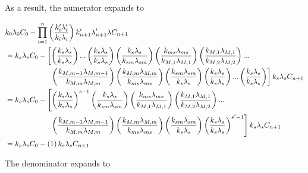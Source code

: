 \noindent As a result, the numerator expands to 

\begin{align*}
     & k_0 \lami{0} C_0 - \prod_{i=1}^n \parfrac{k_i' \lami{i}'}{k_i \lami{i}} k_{n+1}' \lami{n+1}' \lambda C_{n+1} \\
     &= k_s \lami{s} C_0 - \left[ \parfrac{k_s \lami{s}}{k_s \lami{s}} ... \parfrac{k_s \lami{s}}{k_s \lami{s}} \parfrac{k_s \lami{s}}{k_{sm} \lami{sm}} \parfrac{k_{ms} \lami{ms}}{k_{M,1} \lami{M,1}} \parfrac{k_{M,1} \lami{M,1}}{k_{M,2} \lami{M,2}} ... \right. \\
     & \hspace{60px} \left. \parfrac{k_{M,m-1} \lami{M,m-1}}{k_{M,m} \lami{M,m}} \parfrac{k_{M,m} \lami{M,m}}{k_{ms} \lami{ms}} \parfrac{k_{sm} \lami{sm}}{k_s \lami{s}} \parfrac{k_s \lami{s}}{k_s \lami{s}} ... \parfrac{k_s \lami{s}}{k_s \lami{s}} \right] k_s \lami{s} C_{n+1} \\
     &=  k_s \lami{s} C_0 - \left[ \parfrac{k_s \lami{s}}{k_s \lami{s}}^{s-1} \parfrac{k_s \lami{s}}{k_{sm} \lami{sm}} \parfrac{k_{ms} \lami{ms}}{k_{M,1} \lami{M,1}} \parfrac{k_{M,1} \lami{M,1}}{k_{M,2} \lami{M,2}} ... \right. \\
     & \hspace{60px} \left. \parfrac{k_{M,m-1} \lami{M,m-1}}{k_{M,m} \lami{M,m}} \parfrac{k_{M,m} \lami{M,m}}{k_{ms} \lami{ms}} \parfrac{k_{sm} \lami{sm}}{k_s \lami{s}} \parfrac{k_s \lami{s}}{k_s \lami{s}}^{s'-1} \right] k_s \lami{s} C_{n+1} \\
     &= k_s \lami{s} C_0 - \left( 1 \right) k_s \lami{s} C_{n+1}
\end{align*}

\pagebreak

\noindent The denominator expands to 

